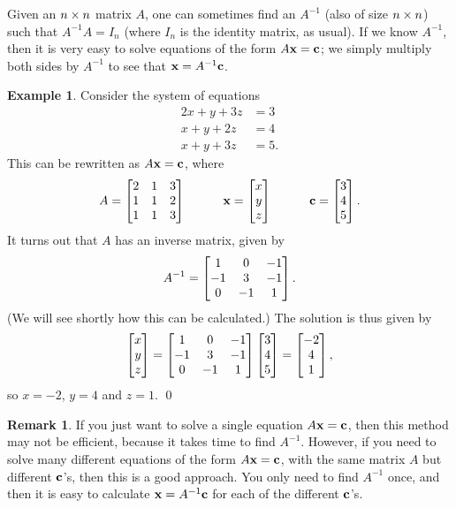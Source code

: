 \documentclass[a4paper]{book}
\theoremstyle{definition}
\newtheorem{remark}[theorem]{Remark}
\newtheorem{example}[theorem]{Example}
\begin{document}
Given an $n\times n$ matrix $A$, one can sometimes find an 
 $A^{-1}$ (also of size $n\times n$) such that
$A^{-1}A=I_n$ (where $I_n$ is the identity matrix, as usual).  If we
know $A^{-1}$, then it is very easy to solve equations of the form
$A\mathbf{x}=\mathbf{c}$; we simply multiply both sides by $A^{-1}$ to see
that $\mathbf{x}=A^{-1}\mathbf{c}$.
\begin{example}
 Consider the system of equations
 \begin{align*}
  2x + y + 3z &= 3 \\
   x + y + 2z &= 4 \\
   x + y + 3z &= 5.
 \end{align*}
 This can be rewritten as $A\mathbf{x}=\mathbf{c}$, where 
 \[ A = \begin{bmatrix} 2&1&3\\ 1&1&2\\ 1&1&3 \end{bmatrix} \hspace{3em}
    \mathbf{x} = \begin{bmatrix} x\\ y\\ z\end{bmatrix} \hspace{3em}
    \mathbf{c} = \begin{bmatrix} 3\\ 4\\ 5\end{bmatrix}.
 \]
 It turns out that $A$ has an inverse matrix, given by
 \[ A^{-1} = \begin{bmatrix} 1&0&-1\\ -1&3&-1\\ 0&-1&1\end{bmatrix}. \]
 (We will see shortly how this can be calculated.)  The solution is
 thus given by
 \[ \begin{bmatrix} x\\ y\\ z\end{bmatrix} = 
     \begin{bmatrix} 1&0&-1\\ -1&3&-1\\ 0&-1&1\end{bmatrix} \begin{bmatrix} 3\\4\\5 \end{bmatrix} = 
      \begin{bmatrix} -2\\ 4\\ 1\end{bmatrix},
 \]
 so $x=-2$, $y=4$ and $z=1$.
 \qed
\end{example}
\begin{remark}
 If you just want to solve a single equation $A\mathbf{x}=\mathbf{c}$, then
 this method may not be efficient, because it takes time to find
 $A^{-1}$.  However, if you need to solve many different equations of
 the form $A\mathbf{x}=\mathbf{c}$, with the same matrix $A$ but different
 $\mathbf{c}$'s, then this is a good approach.  You only need to find
 $A^{-1}$ once, and then it is easy to calculate
 $\mathbf{x}=A^{-1}\mathbf{c}$ for each of the different $\mathbf{c}$'s.
\end{remark}
\end{document}
